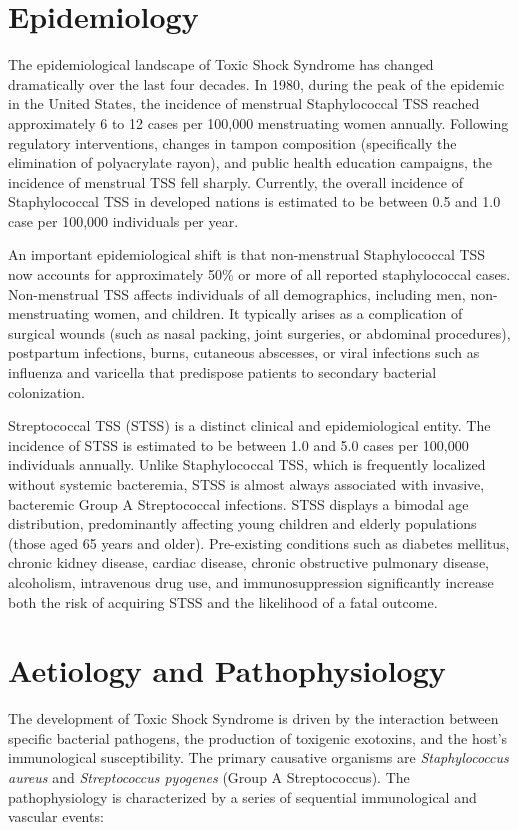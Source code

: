 \section*{Epidemiology}
The epidemiological landscape of Toxic Shock Syndrome has changed dramatically over the last four decades. In 1980, during the peak of the epidemic in the United States, the incidence of menstrual Staphylococcal TSS reached approximately 6 to 12 cases per 100,000 menstruating women annually. Following regulatory interventions, changes in tampon composition (specifically the elimination of polyacrylate rayon), and public health education campaigns, the incidence of menstrual TSS fell sharply. Currently, the overall incidence of Staphylococcal TSS in developed nations is estimated to be between 0.5 and 1.0 case per 100,000 individuals per year.

An important epidemiological shift is that non-menstrual Staphylococcal TSS now accounts for approximately 50\% or more of all reported staphylococcal cases. Non-menstrual TSS affects individuals of all demographics, including men, non-menstruating women, and children. It typically arises as a complication of surgical wounds (such as nasal packing, joint surgeries, or abdominal procedures), postpartum infections, burns, cutaneous abscesses, or viral infections such as influenza and varicella that predispose patients to secondary bacterial colonization.

Streptococcal TSS (STSS) is a distinct clinical and epidemiological entity. The incidence of STSS is estimated to be between 1.0 and 5.0 cases per 100,000 individuals annually. Unlike Staphylococcal TSS, which is frequently localized without systemic bacteremia, STSS is almost always associated with invasive, bacteremic Group A Streptococcal infections. STSS displays a bimodal age distribution, predominantly affecting young children and elderly populations (those aged 65 years and older). Pre-existing conditions such as diabetes mellitus, chronic kidney disease, cardiac disease, chronic obstructive pulmonary disease, alcoholism, intravenous drug use, and immunosuppression significantly increase both the risk of acquiring STSS and the likelihood of a fatal outcome.

\section*{Aetiology and Pathophysiology}
The development of Toxic Shock Syndrome is driven by the interaction between specific bacterial pathogens, the production of toxigenic exotoxins, and the host's immunological susceptibility. The primary causative organisms are \textit{Staphylococcus aureus} and \textit{Streptococcus pyogenes} (Group A Streptococcus). The pathophysiology is characterized by a series of sequential immunological and vascular events:

